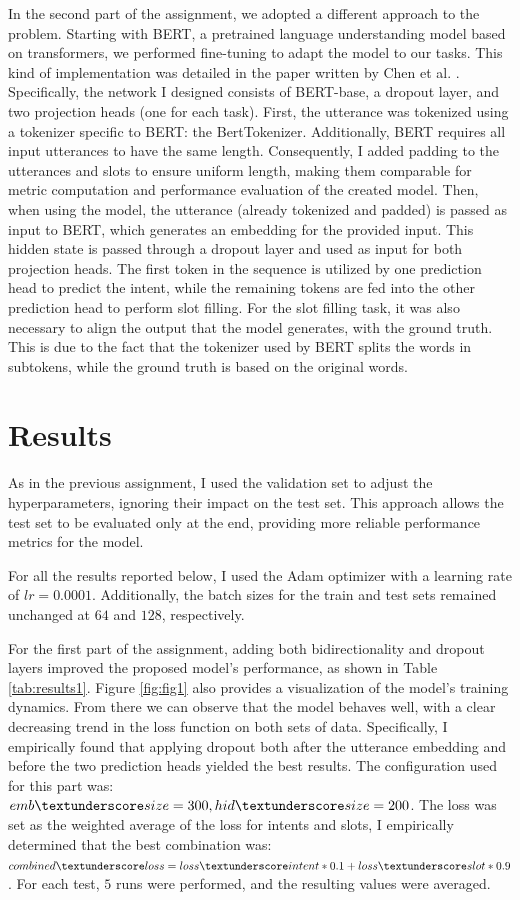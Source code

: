 \documentclass[a4paper]{article}
\begin{document}
In the second part of the assignment, we adopted a different approach to the problem. Starting with BERT, a pretrained language understanding model based on transformers, we performed fine-tuning to adapt the model to our tasks.
This kind of implementation was detailed in the paper written by Chen et al. \cite{BERT}. Specifically, the network I designed consists of BERT-base, a dropout layer, and two projection heads (one for each task).
First, the utterance was tokenized using a tokenizer specific to BERT: the BertTokenizer.
Additionally, BERT requires all input utterances to have the same length. Consequently, I added padding to the utterances and slots to ensure uniform length, making them comparable for metric computation and performance evaluation of the created model.
Then, when using the model, the utterance (already tokenized and padded) is passed as input to BERT, which generates an embedding for the provided input. This hidden state is passed through a dropout layer and used as input for both projection heads. The first token in the sequence is utilized by one prediction head to predict the intent, while the remaining tokens are fed into the other prediction head to perform slot filling.
For the slot filling task, it was also necessary to align the output that the model generates, with the ground truth. This is due to the fact that the tokenizer used by BERT splits the words in subtokens, while the ground truth is based on the original words. 

\section{Results}
As in the previous assignment, I used the validation set to adjust the hyperparameters, ignoring their impact on the test set. This approach allows the test set to be evaluated only at the end, providing more reliable performance metrics for the model.

For all the results reported below, I used the Adam optimizer with a learning rate of \(lr = 0.0001\). Additionally, the batch sizes for the train and test sets remained unchanged at \(64\) and \(128\), respectively.
\newline

For the first part of the assignment, adding both bidirectionality and dropout layers improved the proposed model’s performance, as shown in Table \ref{tab:results1}. 
Figure \ref{fig:fig1} also provides a visualization of the model's training dynamics. From there we can observe that the model behaves well, with a clear decreasing trend in the loss function on both sets of data.
Specifically, I empirically found that applying dropout both after the utterance embedding and before the two prediction heads yielded the best results.
The configuration used for this part was: \(emb \textunderscore size=300, hid \textunderscore size=200\).
The loss was set as the weighted average of the loss for intents and slots, I empirically determined that the best combination was: \(combined \textunderscore loss = loss \textunderscore intent * 0.1 + loss \textunderscore slot * 0.9\).
For each test, \(5\) runs were performed, and the resulting values were averaged.
\end{document}
